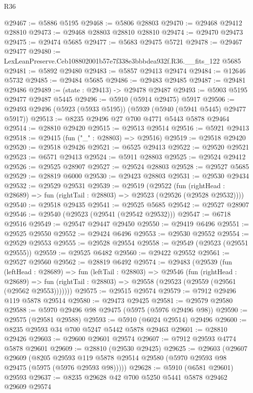 \begin{lexlean}{R36}
\begin{coremodule}
@29467 := @5886 @5195
@29468 := @5806 @28803
@29470 := @29468 @29412 @28810
@29473 := @29468 @28803 @28810 @28810
@29474 := @29470 @29473
@29475 := @29474 @5685
@29477 := @5683 @29475 @5721
@29478 := @29467 @29477
@29480 := LexLeanPreserve.Ceb108802001b57e7f338e3bbbdea932f.R36.__fits_122 @5685
@29481 := @5892 @29480
@29483 := @5857 @29413 @29474
@29484 := @12646 @5732
@29485 := @29484 @5685
@29486 := @29483 @29485
@29487 := @29481 @29486
@29489 := (state : @29413) -> @29478 @29487
@29493 := @5903 @5195 @29477 @29487 @5445
@29496 := @5910 (@5914 @29475) @5917
@29506 := @29493 @29496 (@5923 (@5933 @5195)) (@5939 (@5940 (@5941 @5445) @29477 @5917))
@29513 := @8235 @29496 @27 @700 @4771 @5443 @5878 @29464
@29514 := @28810 @29420
@29515 := @29513 @29514
@29516 := @5921 @29413
@29518 := @29415 (fun ("_" : @28803) => @29516)
@29519 := @29518 @29420
@29520 := @29518 @29426
@29521 := @6525 @29413
@29522 := @29520 @29521
@29523 := @6571 @29413
@29524 := @5911 @28803
@29525 := @29524 @29412
@29526 := @29525 @28907
@29527 := @29524 @28803
@29528 := @29527 @5685
@29529 := @28819 @6000
@29530 := @29423 @28803
@29531 := @29530 @29434
@29532 := @29529 @29531
@29539 := @29519
    (@29522
      (fun (rightHead : @28689) => fun (rightTail : @28803) => @29523 (@29526 (@29528 @29532))))
@29540 := @29518 @29435
@29541 := @29525 @5685
@29542 := @29527 @28907
@29546 := @29540 (@29523 (@29541 (@29542 @29532)))
@29547 := @6718 @29516
@29549 := @29547 @29447 @29450
@29550 := @29419 @6496
@29551 := @29525 @29550
@29552 := @29424 @6496
@29553 := @29530 @29552
@29554 := @29529 @29553
@29555 := @29528 @29554
@29558 := @29549 (@29523 (@29551 @29555))
@29559 := @29525 @6482
@29560 := @29422 @29552
@29561 := @29527 @29560
@29562 := @28819 @6492
@29574 := @29483
    (@29539
      (fun (leftHead : @28689) =>
      fun (leftTail : @28803) =>
      @29546
        (fun (rightHead : @28689) =>
        fun (rightTail : @28803) => @29558 (@29523 (@29559 (@29561 (@29562 @29553)))))))
@29575 := @29515 @29574
@29579 := @7912 @29496 @119 @5878 @29514
@29580 := @29473 @29425
@29581 := @29579 @29580
@29588 := @5970 @29496 @98 @29475 (@5975 (@5976 @29496 @98))
@29590 := @29575 (@29581 @29588)
@29593 := @5910 (@6024 @29514) @29496
@29600 := @8235 @29593 @34 @700 @5247 @5442 @5878 @29463
@29601 := @28810 @29426
@29603 := @29600 @29601 @29574
@29607 := @7912 @29593 @4774 @5878 @29601
@29609 := @28810 (@29530 @29425)
@29625 := @29603
    (@29607
      @29609
      (@8205 @29593 @119 @5878 @29514 @29580 (@5970 @29593 @98 @29475 (@5975 (@5976 @29593 @98)))))
@29628 := @5910 (@6581 @29601) @29593
@29637 := @8235 @29628 @42 @700 @5250 @5441 @5878 @29462 @29609 @29574

\end{coremodule}
\end{lexlean}

